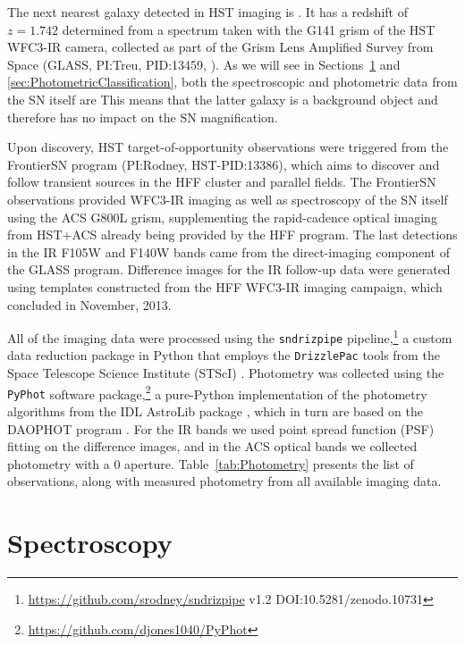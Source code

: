 The next nearest galaxy detected in HST imaging is . It has a redshift of $z=1.742$
determined from a spectrum taken with the G141 grism of the HST
WFC3-IR camera, collected as part of the Grism Lens Amplified Survey
from Space (GLASS, PI:Treu, PID:13459, \citealt{Treu:2015}).  As we
will see in Sections~\ref{sec:Spectroscopy}
and \ref{sec:PhotometricClassification}, both the spectroscopic and
photometric data from the SN itself are   This means
that the latter galaxy is a background object and therefore has no
impact on the SN magnification.

Upon discovery, HST target-of-opportunity observations were triggered
from the FrontierSN program (PI:Rodney, HST-PID:13386), which aims to
discover and follow transient sources in the HFF cluster and parallel
fields. The FrontierSN observations provided WFC3-IR imaging as well
as spectroscopy of the SN itself using the ACS G800L grism,
supplementing the rapid-cadence optical imaging from HST+ACS already
being provided by the HFF program. The last detections in the IR F105W
and F140W bands came from the direct-imaging component of the GLASS
program.  Difference images for the IR follow-up data were generated
using templates constructed from the HFF WFC3-IR imaging campaign,
which concluded in November, 2013.

All of the imaging data were processed using the {\tt sndrizpipe}
pipeline,\footnote{\url{https://github.com/srodney/sndrizpipe} v1.2
DOI:10.5281/zenodo.10731} a custom data reduction package in Python
that employs the {\tt DrizzlePac} tools from the Space Telescope
Science Institute (STScI) \citep{Fruchter:2010}.  Photometry was
collected using the {\tt PyPhot} software
package,\footnote{\url{https://github.com/djones1040/PyPhot}} a
pure-Python implementation of the photometry algorithms from the IDL
AstroLib package \citep{Landsman:1993}, which in turn are based on the
DAOPHOT program \citep{Stetson:1987}.  For the IR bands we used point
spread function (PSF) fitting on the difference images, and in the ACS
optical bands we collected photometry with a
0 aperture. Table~\ref{tab:Photometry} presents the list of
observations, along with measured photometry from all available
imaging data.
 


\section{Spectroscopy}
\label{sec:Spectroscopy}

